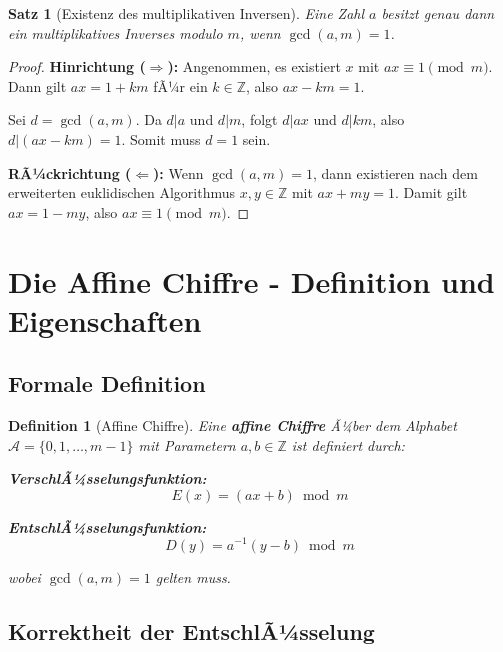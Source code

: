 ﻿\documentclass[12pt,a4paper]{article}
\newtheorem{theorem}{Satz}
\newtheorem{definition}{Definition}
\begin{document}
	\begin{theorem}[Existenz des multiplikativen Inversen]
		Eine Zahl $a$ besitzt genau dann ein multiplikatives Inverses modulo $m$, wenn $\gcd(a,m) = 1$.
	\end{theorem}
	
	\begin{proof}
		\textbf{Hinrichtung ($\Rightarrow$):} 
		Angenommen, es existiert $x$ mit $ax \equiv 1 \pmod{m}$. Dann gilt $ax = 1 + km$ fÃ¼r ein $k \in \mathbb{Z}$, also $ax - km = 1$.
		
		Sei $d = \gcd(a,m)$. Da $d|a$ und $d|m$, folgt $d|ax$ und $d|km$, also $d|(ax-km) = 1$. Somit muss $d = 1$ sein.
		
		\textbf{RÃ¼ckrichtung ($\Leftarrow$):}
		Wenn $\gcd(a,m) = 1$, dann existieren nach dem erweiterten euklidischen Algorithmus $x,y \in \mathbb{Z}$ mit $ax + my = 1$. Damit gilt $ax = 1 - my$, also $ax \equiv 1 \pmod{m}$.
	\end{proof}
	
	\section{Die Affine Chiffre - Definition und Eigenschaften}
	
	\subsection{Formale Definition}
	
	\begin{definition}[Affine Chiffre]
		Eine \textbf{affine Chiffre} Ã¼ber dem Alphabet $\mathcal{A} = \{0, 1, \ldots, m-1\}$ mit Parametern $a, b \in \mathbb{Z}$ ist definiert durch:
		
		\textbf{VerschlÃ¼sselungsfunktion:}
		\begin{equation}
			E(x) = (ax + b) \bmod m
		\end{equation}
		
		\textbf{EntschlÃ¼sselungsfunktion:}
		\begin{equation}
			D(y) = a^{-1}(y - b) \bmod m
		\end{equation}
		
		wobei $\gcd(a,m) = 1$ gelten muss.
	\end{definition}
	
	\subsection{Korrektheit der EntschlÃ¼sselung}
	
\end{document}
